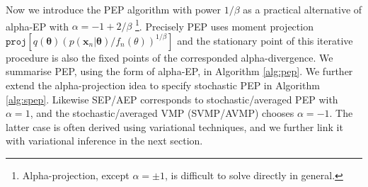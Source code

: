 \documentclass{article} %
\begin{document}
Now we introduce the PEP algorithm with power $1 / \beta$ as a practical alternative of alpha-EP with $\alpha = -1 + 2 / \beta$ \footnote{Alpha-projection, except $\alpha = \pm 1$, is difficult to solve directly in general.}. Precisely PEP uses moment projection $\mathtt{proj}[q(\bm{\theta}) (p(\bm{x}_n|\bm{\theta}) / f_n(\theta))^{1/\beta}]$ and the stationary point of this iterative procedure is also the fixed points of the corresponded alpha-divergence. 
%
We summarise PEP, using the form of alpha-EP, in Algorithm \ref{alg:pep}. We further extend the alpha-projection idea to specify stochastic PEP in Algorithm \ref{alg:spep}. Likewise SEP/AEP corresponds to stochastic/averaged PEP with $\alpha = 1$, and the stochastic/averaged VMP (SVMP/AVMP) chooses $\alpha = -1$. The latter case is often derived using variational techniques, and we further link it with variational inference in the next section.
\end{document}
